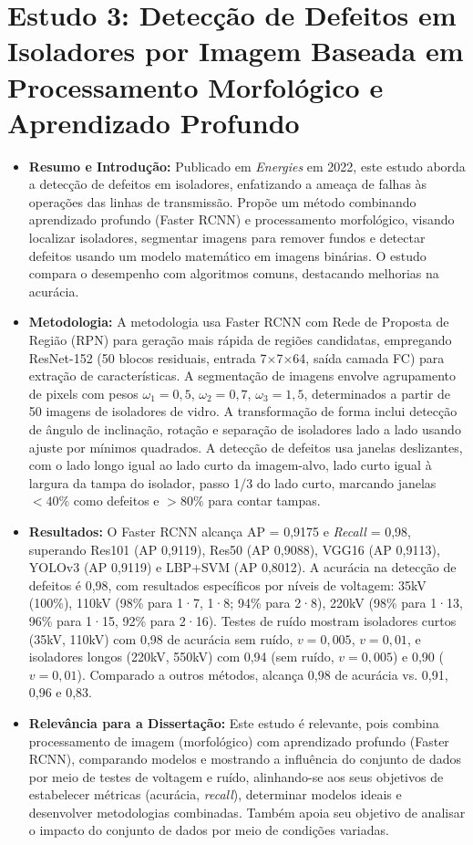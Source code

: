 \section{Estudo 3: Detecção de Defeitos em Isoladores por Imagem Baseada em Processamento Morfológico e Aprendizado Profundo}
\begin{itemize}
    \item \textbf{Resumo e Introdução:} Publicado em \textit{Energies} em 2022, este estudo aborda a detecção de defeitos em isoladores, enfatizando a ameaça de falhas às operações das linhas de transmissão. Propõe um método combinando aprendizado profundo (Faster RCNN) e processamento morfológico, visando localizar isoladores, segmentar imagens para remover fundos e detectar defeitos usando um modelo matemático em imagens binárias. O estudo compara o desempenho com algoritmos comuns, destacando melhorias na acurácia.
    \item \textbf{Metodologia:} A metodologia usa Faster RCNN com Rede de Proposta de Região (RPN) para geração mais rápida de regiões candidatas, empregando ResNet-152 (50 blocos residuais, entrada 7$\times$7$\times$64, saída camada FC) para extração de características. A segmentação de imagens envolve agrupamento de pixels com pesos $\omega_1=0,5$, $\omega_2=0,7$, $\omega_3=1,5$, determinados a partir de 50 imagens de isoladores de vidro. A transformação de forma inclui detecção de ângulo de inclinação, rotação e separação de isoladores lado a lado usando ajuste por mínimos quadrados. A detecção de defeitos usa janelas deslizantes, com o lado longo igual ao lado curto da imagem-alvo, lado curto igual à largura da tampa do isolador, passo 1/3 do lado curto, marcando janelas $<40\%$ como defeitos e $>80\%$ para contar tampas.
    \item \textbf{Resultados:} O Faster RCNN alcança AP = 0,9175 e \textit{Recall} = 0,98, superando Res101 (AP 0,9119), Res50 (AP 0,9088), VGG16 (AP 0,9113), YOLOv3 (AP 0,9119) e LBP+SVM (AP 0,8012). A acurácia na detecção de defeitos é 0,98, com resultados específicos por níveis de voltagem: 35kV (100\%), 110kV (98\% para 1·7, 1·8; 94\% para 2·8), 220kV (98\% para 1·13, 96\% para 1·15, 92\% para 2·16). Testes de ruído mostram isoladores curtos (35kV, 110kV) com 0,98 de acurácia sem ruído, $v=0,005$, $v=0,01$, e isoladores longos (220kV, 550kV) com 0,94 (sem ruído, $v=0,005$) e 0,90 ($v=0,01$). Comparado a outros métodos, alcança 0,98 de acurácia vs. 0,91, 0,96 e 0,83.
    \item \textbf{Relevância para a Dissertação:} Este estudo é relevante, pois combina processamento de imagem (morfológico) com aprendizado profundo (Faster RCNN), comparando modelos e mostrando a influência do conjunto de dados por meio de testes de voltagem e ruído, alinhando-se aos seus objetivos de estabelecer métricas (acurácia, \textit{recall}), determinar modelos ideais e desenvolver metodologias combinadas. Também apoia seu objetivo de analisar o impacto do conjunto de dados por meio de condições variadas.
\end{itemize}


